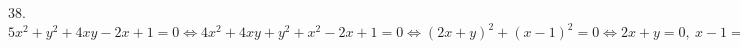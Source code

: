 38. $5x^2+y^2+4xy-2x+1=0\Leftrightarrow 4x^2+4xy+y^2+x^2-2x+1=0\Leftrightarrow(2x+y)^2+(x-1)^2=0\Leftrightarrow2x+y=0,\ x-1=0\Leftrightarrow
x=1,\ y=-2.$\\
